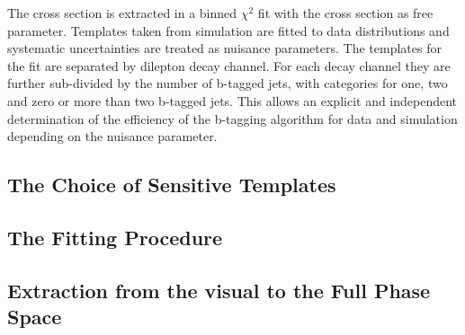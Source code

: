 The cross section is extracted in a binned $\chi^2$ fit with the \ttbar cross section as free parameter. Templates taken from simulation are fitted to data distributions and systematic uncertainties are treated as nuisance parameters. 
The templates for the fit are separated by dilepton decay channel. For each decay channel they are further sub-divided by the number of b-tagged jets, with categories for one, two and zero or more than two b-tagged jets. This allows an explicit and independent determination of the efficiency of the b-tagging algorithm for data and simulation depending on the nuisance parameter.

\subsection{The Choice of Sensitive Templates}
\label{sec:xsec_templates}
	
\subsection{The Fitting Procedure}
\label{sec:xsec_stat}

\subsection{Extraction from the visual to the Full Phase Space}
\label{sec:xsec_extraction}


